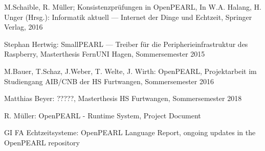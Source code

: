 \begin{thebibliography}{99}
   M.Schaible, R. M\"uller; Konsistenzpr\"ufungen in OpenPEARL,
   In W.A. Halang, H. Unger (Hrsg.): Informatik aktuell --- 
   Internet der Dinge und Echtzeit, Springer Verlag, 2016

    Stephan Hertwig: SmallPEARL ---
    Treiber f\"ur die Peripherieinfrastruktur des Raspberry,
    Masterthesis FernUNI Hagen, Sommersemester 2015
 
    M.Bauer, T.Schaz, J.Weber, T. Welte, J. Wirth: OpenPEARL,
    Projektarbeit im Studiengang AIB/CNB der HS Furtwangen, Sommersemester 2016

    Matthias Beyer: ?????,
    Masterthesis HS Furtwangen, Sommersemester 2018

   R. M\"uller: OpenPEARL - Runtime System, Project Document

GI FA Echtzeitsysteme: OpenPEARL Language Report,
    ongoing updates in the OpenPEARL repository 
\end{thebibliography}
~                          
